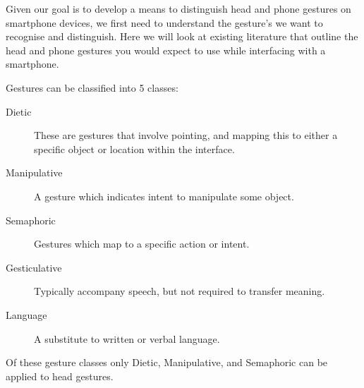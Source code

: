 


Given our goal is to develop a means to distinguish head and phone gestures on smartphone devices, we first need to understand the gesture's we want to recognise and distinguish.
Here we will look at existing literature that outline the head and phone gestures you would expect to use while interfacing with a smartphone.


Gestures can be classified into 5 classes\cite{karam2005taxonomy}:
\begin{description}
    \item[Dietic] These are gestures that involve pointing, and mapping this to either a specific object or location within the interface.
    \item[Manipulative] A gesture which indicates intent to manipulate some object.
    \item[Semaphoric] Gestures which map to a specific action or intent.
    \item[Gesticulative] Typically accompany speech, but not required to transfer meaning.
    \item[Language] A substitute to written or verbal language.
\end{description}
Of these gesture classes only Dietic, Manipulative, and Semaphoric can be applied to head gestures.



